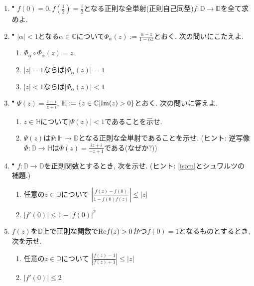 \documentclass[dvipdfmx,a4paper,11pt]{article}
\newcommand{\C}{\mathbb{C}}
\newcommand{\D}{\mathbb{D}}
\theoremstyle{definition}
\begin{document}
\begin{enumerate}[label=\textbf{問}7.\arabic*]

\item$^{\bullet}$ $f(0)=0, f(\frac{1}{2})=\frac{i}{2}$となる正則な全単射(正則自己同型)$f : \D \to \D$を全て求めよ.

\item \label{isom} $^{\bullet}$ $|\alpha| <1$となる$\alpha \in \C$について$\Phi_{\alpha}(z) := \frac{\alpha - z}{1 - \bar{\alpha} z}$とおく. 次の問いにこたえよ. 
  \begin{enumerate}
\setlength{\parskip}{0cm} 
  \setlength{\itemsep}{0cm} 
  \item $\Phi_{\alpha} \circ \Phi_{\alpha}(z) =z$.
  \item $|z|=1$ならば$|\Phi_{\alpha}(z)|=1$
    \item $|z|<1$ならば$|\Phi_{\alpha}(z)| < 1$
\end{enumerate}

\item \label{HtoD}$^{\bullet}$ $\Psi(z) = \frac{z-i}{z+i}$, $\mathbb{H}:=\{ z \in \C | {\rm Im}(z) >0\}$とおく. 次の問いに答えよ.
  \begin{enumerate}
\setlength{\parskip}{0cm} 
  \setlength{\itemsep}{0cm} 
  \item $z \in \mathbb{H}$について$|\Psi(z)| < 1$であることを示せ.
  \item $\Psi(z)$は$\Psi :  \mathbb{H} \to \D$となる正則な全単射であることを示せ. (ヒント: 逆写像$\Phi : \D \to \mathbb{H}$は$\Phi(z)=\frac{iz + i}{-z +1}$である(なぜか?))
  \end{enumerate}
  
\item $^{\bullet}$ $f : \D \to \D$を正則関数とするとき, 次を示せ. (ヒント: \ref{isom}とシュワルツの補題.)
  \begin{enumerate}
\setlength{\parskip}{0cm} 
  \setlength{\itemsep}{0cm} 
  \item 任意の$z \in \D$について
  $
  \left|\frac{f(z) - f(0)}{1 - \overline{f(0)} f(z)}\right| \le |z|
  $
  \item $|f' (0)| \le 1 - |f(0)|^2$
    \end{enumerate}
    
    \item $f(z)$を$\D$上で正則な関数で${\rm Re}f(z) >0$かつ$f(0)=1$となるものとするとき, 次を示せ.
     \begin{enumerate}
\setlength{\parskip}{0cm} 
  \setlength{\itemsep}{0cm} 
  \item 任意の$z \in \D$について $ \left|\frac{f(z) -1}{f(z)+1} \right| \le |z|$
    \item $ \left|f'(0) \right| \le 2$
  \end{enumerate} 
  

\end{enumerate}
\end{document}
